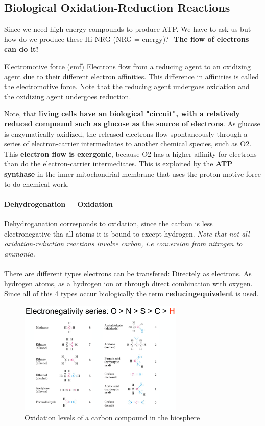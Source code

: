 \documentclass[../main.tex]{subfiles}
\begin{document}
\subsection{Biological Oxidation-Reduction Reactions}
Since we need high energy compounds to produce ATP. We have to ask us but how do we produce these Hi-NRG (NRG = energy)? -\textbf{The flow of electrons can do it!} 
\begin{DefWithTitle}{Electromotive force (emf)}
	Electrons flow from a reducing agent to an oxidizing agent due to their different electron affinities. This difference in affinities is called the electromotive force. Note that the reducing agent undergoes oxidation and the oxidizing agent undergoes reduction. 
\end{DefWithTitle}
\noindent Note, that \textbf{living cells have an biological "circuit", with a relatively reduced compound such as glucose as the source of electrons}. As glucose is enzymatically oxidized, the released electrons flow spontaneously through a series of electron-carrier intermediates to another chemical species, such as O2. This \textbf{electron flow is exergonic}, because O2 has a higher affinity for electrons than do the electron-carrier intermediates. This is exploited by the \textbf{ATP synthase} in the inner mitochondrial membrane that uses the proton-motive force to do chemical work. 

\paragraph{Dehydrogenation = Oxidation}
Dehydroganation corresponds to oxidation, since the carbon is less electronegative tha all atoms it is bound to except hydrogen. \textit{Note that not all oxidation-reduction reactions involve carbon, i.e conversion from nitrogen to ammonia.}\\
\\
There are different types electrons can be transfered: Directely as electrons, As hydrogen atoms, as a hydrogen ion or through direct combination with oxygen. Since all of this 4 types occur biologically the term \textbf{\gls{reducingequivalent}} is used.
 
\begin{figure}[H]
	\centering
	\includegraphics[width=0.7\textwidth]{reduction}
	\caption{Oxidation levels of a carbon compound in the biosphere}
\end{figure}
\end{document}
